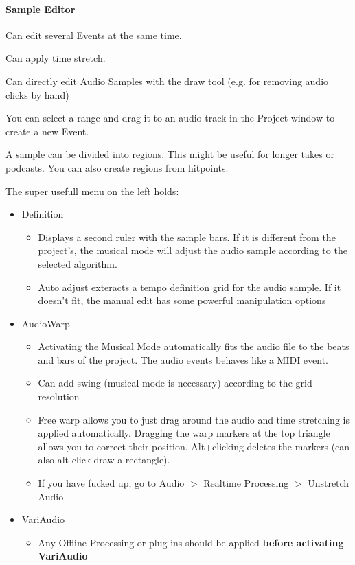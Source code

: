 \documentclass[10pt]{article}
\begin{document}
\paragraph{Sample Editor}

Can edit several Events at the same time.

Can apply time stretch.

Can directly edit Audio Samples with the draw tool (e.g. for removing audio clicks by hand)

You can select a range and drag it to an audio track in the Project window to create a new Event.

A sample can be divided into regions. This might be useful for longer takes or podcasts. You can also create regions from hitpoints.

The super usefull menu on the left holds:
\begin{itemize}
	\item Definition
	\begin{itemize}
		\item Displays a second ruler with the sample bars. If it is different from the project's, the musical mode will adjust the audio sample according to the selected algorithm.
		\item Auto adjust exteracts a tempo definition grid for the audio sample. If it doesn't fit, the manual edit has some powerful manipulation options
	\end{itemize}
	\item AudioWarp
	\begin{itemize}
		\item Activating the Musical Mode automatically fits the audio file to the beats and bars of the project. The audio events behaves like a MIDI event.
		\item Can add swing (musical mode is necessary) according to the grid resolution
		\item Free warp allows you to just drag around the audio and time stretching is applied automatically. Dragging the warp markers at the top triangle allows you to correct their position. Alt+clicking deletes the markers (can also alt-click-draw a rectangle).
		\item If you have fucked up, go to Audio $>$ Realtime Processing $>$ Unstretch Audio
	\end{itemize}
	\item VariAudio
	\begin{itemize}
		\item Any Offline Processing or plug-ins should be applied \textbf{before activating VariAudio}

\end{itemize}
\end{itemize}
\end{document}

